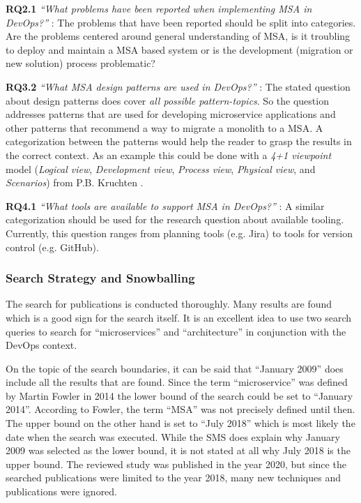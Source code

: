 \textbf{RQ2.1} \textit{``What problems have been reported 
when implementing MSA in DevOps?''} \wsl:
The problems that have been reported should be split
into categories. Are the problems centered around general understanding of
MSA, is it troubling to deploy and maintain a MSA based system or
is the development (migration or new solution) process problematic?

\textbf{RQ3.2} \textit{``What MSA design patterns are used in DevOps?''} \wsl:
The stated question about design patterns does
cover \textit{all possible pattern-topics}. So the question addresses
patterns that are used for developing microservice applications and
other patterns that recommend a way to migrate a monolith to a MSA.
A categorization between the patterns would help the reader to
grasp the results in the correct context. As an example this could be done
with a \textit{4+1 viewpoint} model (\textit{Logical view},
\textit{Development view}, \textit{Process view}, \textit{Physical view},
and \textit{Scenarios}) from P.B. Kruchten \cite{kruchten:Viewmodels}.

\textbf{RQ4.1} \textit{``What tools are available to support MSA in DevOps?''} \wsl:
A similar categorization should be used for the
research question about available tooling. Currently, this question
ranges from planning tools (e.g. Jira) to tools for version control
(e.g. GitHub).

\subsubsection{Search Strategy and Snowballing}

The search for publications is conducted thoroughly. Many results
are found which is a good sign for the search itself. It is an excellent
idea to use two search queries to search for ``microservices'' and
``architecture'' in conjunction with the DevOps context.

On the topic of the search boundaries, it can be said that ``January 2009''
does include all the results that are found. Since the term ``microservice''
was defined by Martin Fowler in 2014 \cite{fowler:microservices} the lower
bound of the search could be set to ``January 2014''. According to Fowler,
the term ``MSA'' was not precisely defined until then.
The upper bound on the other hand is set to ``July 2018'' which is most likely
the date when the search was executed. While the SMS does explain
why January 2009 was selected as the lower bound, it is not stated
at all why July 2018 is the upper bound. The reviewed study was published
in the year 2020, but since the searched publications were limited
to the year 2018, many new techniques and publications were ignored.

